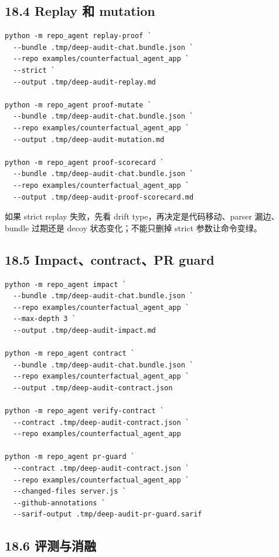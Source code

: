 \documentclass[UTF8,12pt,openany]{ctexbook}
\begin{document}
\subsection{18.4 Replay 和 mutation}

\begin{lstlisting}
python -m repo_agent replay-proof `
  --bundle .tmp/deep-audit-chat.bundle.json `
  --repo examples/counterfactual_agent_app `
  --strict `
  --output .tmp/deep-audit-replay.md

python -m repo_agent proof-mutate `
  --bundle .tmp/deep-audit-chat.bundle.json `
  --repo examples/counterfactual_agent_app `
  --output .tmp/deep-audit-mutation.md

python -m repo_agent proof-scorecard `
  --bundle .tmp/deep-audit-chat.bundle.json `
  --repo examples/counterfactual_agent_app `
  --output .tmp/deep-audit-proof-scorecard.md
\end{lstlisting}

如果 strict replay 失败，先看 drift type，再决定是代码移动、parser 漏边、bundle 过期还是 decoy 状态变化；不能只删掉 strict 参数让命令变绿。\par

\subsection{18.5 Impact、contract、PR guard}

\begin{lstlisting}
python -m repo_agent impact `
  --bundle .tmp/deep-audit-chat.bundle.json `
  --repo examples/counterfactual_agent_app `
  --max-depth 3 `
  --output .tmp/deep-audit-impact.md

python -m repo_agent contract `
  --bundle .tmp/deep-audit-chat.bundle.json `
  --repo examples/counterfactual_agent_app `
  --output .tmp/deep-audit-contract.json

python -m repo_agent verify-contract `
  --contract .tmp/deep-audit-contract.json `
  --repo examples/counterfactual_agent_app

python -m repo_agent pr-guard `
  --contract .tmp/deep-audit-contract.json `
  --repo examples/counterfactual_agent_app `
  --changed-files server.js `
  --github-annotations `
  --sarif-output .tmp/deep-audit-pr-guard.sarif
\end{lstlisting}

\subsection{18.6 评测与消融}
\end{document}
